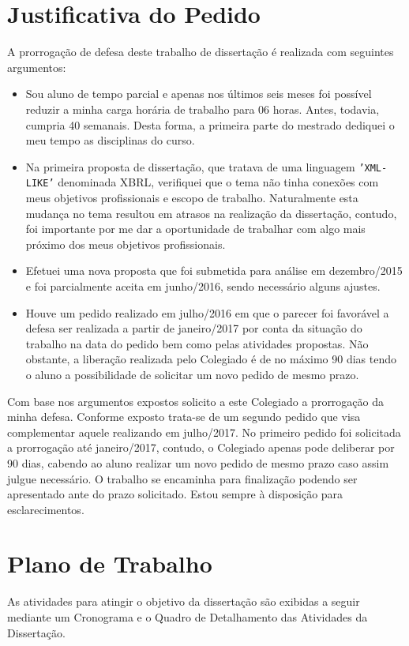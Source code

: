 \documentclass[10pt,a4paper]{report}
\begin{document}
\section{Justificativa do Pedido}
\label{justificativa}

A prorrogação de defesa deste trabalho de dissertação é realizada com seguintes argumentos:

\begin{itemize}
	\item Sou aluno de tempo parcial e apenas nos últimos seis meses foi
		possível	reduzir a minha carga horária de trabalho para 06 horas.
		Antes, todavia, cumpria 40 semanais. Desta forma, a primeira parte do
		mestrado dediquei o meu tempo as disciplinas do curso. 
	\item  Na primeira proposta de dissertação, que tratava de uma linguagem
		\texttt{'XML-LIKE'} denominada XBRL, verifiquei que o tema não tinha
		conexões com meus objetivos profissionais e escopo de trabalho.
		Naturalmente esta mudança no tema resultou em atrasos na realização da
		dissertação, contudo, foi importante por me dar a oportunidade de
		trabalhar com algo mais próximo dos meus objetivos profissionais.
	\item Efetuei uma nova proposta que foi submetida para análise em
		dezembro/2015 e foi parcialmente aceita em junho/2016, sendo necessário
		alguns ajustes.
	\item Houve um pedido realizado em julho/2016 em que o parecer foi favorável
		a defesa ser realizada a partir de janeiro/2017 por conta da situação do
		trabalho na data do pedido bem como pelas atividades propostas. Não
		obstante, a liberação realizada pelo Colegiado é de no máximo 90 dias
		tendo o aluno a possibilidade de solicitar um novo pedido de mesmo
		prazo.
\end{itemize}

Com base nos argumentos expostos solicito a este Colegiado a prorrogação da
minha defesa. Conforme exposto trata-se de um segundo pedido que visa
complementar aquele realizando em julho/2017. No primeiro pedido foi solicitada
a prorrogação até janeiro/2017, contudo, o Colegiado apenas pode deliberar por
90 dias, cabendo ao aluno realizar um novo pedido de mesmo prazo caso assim
julgue necessário. O trabalho se encaminha para finalização podendo ser
apresentado ante do prazo solicitado. Estou sempre à disposição para
esclarecimentos.

\section{Plano de Trabalho}
\label{Plano de Trabalho}
 As atividades para atingir o objetivo da dissertação são exibidas a seguir mediante um Cronograma e o Quadro de Detalhamento das Atividades da Dissertação. 

 
 
 



\end{document}
